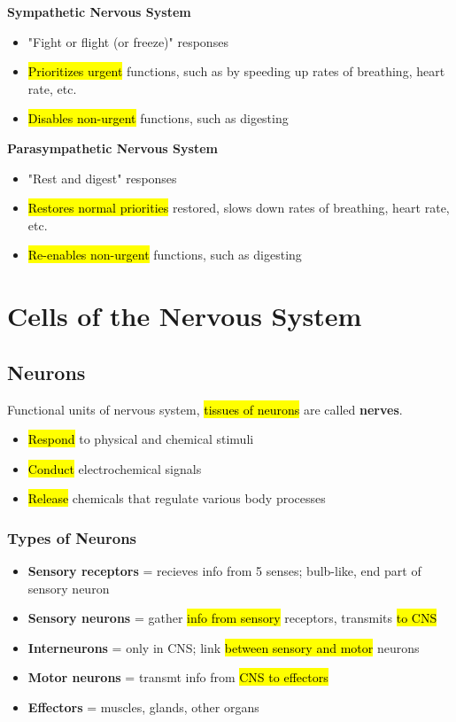 \documentclass[a4paper,12pt]{article}
\begin{document}
\textbf{Sympathetic Nervous System}
\begin{itemize}
    \item{"Fight or flight (or freeze)" responses}
    \item{\hl{Prioritizes urgent} functions, such as by speeding up rates of breathing, heart rate, etc.}
    \item{\hl{Disables non-urgent} functions, such as digesting}
        \\
\end{itemize}

\textbf{Parasympathetic Nervous System}
\begin{itemize}
    \item{"Rest and digest" responses}
    \item{\hl{Restores normal priorities} restored, slows down rates of breathing, heart rate, etc.}
    \item{\hl{Re-enables non-urgent} functions, such as digesting}
\end{itemize}

\pagebreak

\section{Cells of the Nervous System}
\subsection{Neurons}
Functional units of nervous system, \hl{tissues of neurons} are called \textbf{nerves}.
\begin{itemize}
    \item{\hl{Respond} to physical and chemical stimuli}
    \item{\hl{Conduct} electrochemical signals}
    \item{\hl{Release} chemicals that regulate various body processes}
\end{itemize}

\subsubsection{Types of Neurons}
\begin{itemize}
    \item{\textbf{Sensory receptors} = recieves info from 5 senses; bulb-like, end part of sensory neuron}
    \item{\textbf{Sensory neurons} = gather \hl{info from sensory} receptors, transmits \hl{to CNS}}
    \item{\textbf{Interneurons} = only in CNS; link \hl{between sensory and motor} neurons}
    \item{\textbf{Motor neurons} = transmt info from \hl{CNS to effectors}}
    \item{\textbf{Effectors} = muscles, glands, other organs}
\end{itemize}
\end{document}
